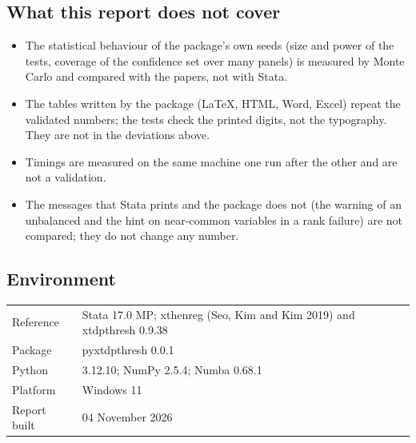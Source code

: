 \subsection{What this report does not cover}
\begin{itemize}
\item The statistical behaviour of the package's own seeds (size and power of the tests, coverage
of the confidence set over many panels) is measured by Monte Carlo and compared with the papers,
not with Stata.
\item The tables written by the package (LaTeX, HTML, Word, Excel) repeat the validated numbers;
the tests check the printed digits, not the typography. They are not in the deviations above.
\item Timings are measured on the same machine one run after the other and are not a validation.
\item The messages that Stata prints and the package does not (the warning of an unbalanced
 and the hint on near-common variables in a rank failure) are not compared;
they do not change any number.
\end{itemize}
\subsection{Environment}
\begin{tabular}{@{}ll@{}}
Reference & Stata 17.0 MP; xthenreg (Seo, Kim and Kim 2019) and xtdpthresh 0.9.38 \\
Package & pyxtdpthresh 0.0.1 \\
Python & 3.12.10; NumPy 2.5.4; Numba 0.68.1 \\
Platform & Windows 11 \\
Report built & 04 November 2026 \\
\end{tabular}
